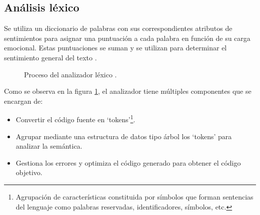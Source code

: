 \documentclass[12pt,twoside]{article}
\begin{document}
	\subsection{Análisis léxico}
	Se utiliza un diccionario de palabras con sus correspondientes atributos de sentimientos para asignar una puntuación a cada palabra en función de su carga emocional. Estas puntuaciones se suman y se utilizan para determinar el sentimiento general del texto \cite{info: pln3}.
	
	\begin{figure}[H]
		\centering
		\caption{Proceso del analizador léxico \cite{info: analizador_lexico}.}
		\label{img: analizador_lexico}
	\end{figure}
	
	Como se observa en la figura \ref{img: analizador_lexico}, el analizador tiene múltiples componentes que se encargan de:
	
	\begin{itemize}
		\item Convertir el código fuente en `tokens'\footnote{Agrupación de características constituida por símbolos  que forman sentencias del lenguaje como palabras reservadas, identificadores, símbolos, etc.}.
		\item Agrupar mediante una estructura de datos tipo árbol los `tokens' para analizar la semántica.
		\item Gestiona los errores y optimiza el código generado para obtener el código objetivo.
	\end{itemize}
	
\end{document}
